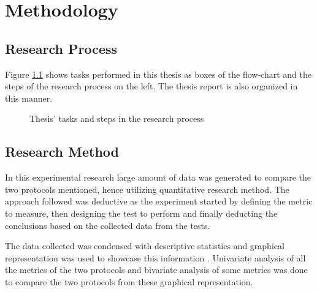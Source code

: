 \chapter{Methodology} \label{3Method}

\section{Research Process}

Figure \ref{RePrSteps} shows tasks performed in this thesis as boxes of the flow-chart and the steps of the research process on the left. The thesis report is also organized in this manner.

\begin{figure}[h]
\centering
\def\svgwidth{0.93\columnwidth}

\vspace{-10pt}
\caption{Thesis' tasks and steps in the research process}
\label{RePrSteps}
\vspace{-10pt}
\end{figure}

\section{Research Method}

In this experimental research large amount of data was generated to compare the two protocols mentioned, hence utilizing quantitative research method. The approach followed was deductive as the experiment started by defining the metric to measure, then designing the test to perform and finally deducting the conclusions based on the collected data from the tests.

The data collected was condensed with descriptive statistics and graphical representation was used to showcase this information \cite{trochim2005research}. Univariate analysis of all the metrics of the two protocols and bivariate analysis of some metrics was done to compare the two protocols from these graphical representation.